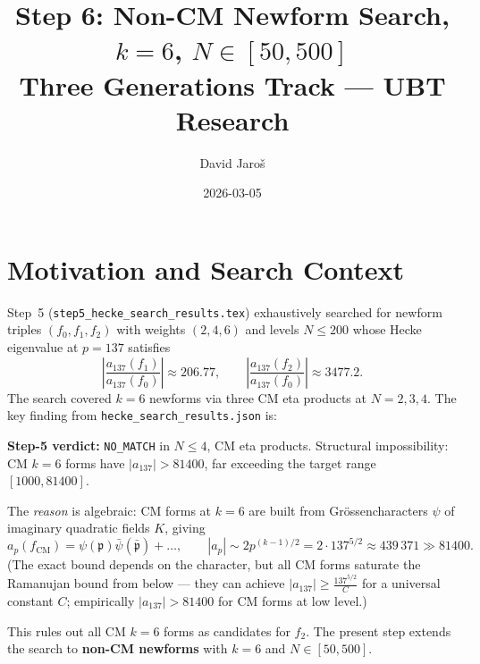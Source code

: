 \documentclass[12pt,a4paper]{article}
\title{%
  Step 6: Non-CM Newform Search, $k=6$, $N \in [50, 500]$\\
  \large Three Generations Track --- UBT Research}
\author{David Jaroš}
\date{2026-03-05}
\theoremstyle{definition}
\theoremstyle{remark}
\begin{document}
\maketitle
\tableofcontents

\section{Motivation and Search Context}
\label{sec:motivation}

Step~5 (\texttt{step5\_hecke\_search\_results.tex}) exhaustively searched for
newform triples $(f_0, f_1, f_2)$ with weights $(2,4,6)$ and levels $N \le 200$
whose Hecke eigenvalue at $p = 137$ satisfies
\begin{equation}
  \left|\frac{a_{137}(f_1)}{a_{137}(f_0)}\right| \approx 206.77,
  \qquad
  \left|\frac{a_{137}(f_2)}{a_{137}(f_0)}\right| \approx 3477.2.
  \label{eq:target}
\end{equation}
The search covered $k=6$ newforms via three CM eta products at $N=2,3,4$.
The key finding from \texttt{hecke\_search\_results.json} is:

\begin{center}
  \colorbox{failred!15}{%
    \parbox{0.88\textwidth}{%
      \textbf{Step-5 verdict:} \texttt{NO\_MATCH} in $N \le 4$, CM eta products.%
      Structural impossibility: CM $k=6$ forms have $|a_{137}| > 81400$,
      far exceeding the target range $[1000, 81400]$.}}
\end{center}

The \emph{reason} is algebraic: CM forms at $k=6$ are built from Grössencharacters
$\psi$ of imaginary quadratic fields $K$, giving
\begin{equation}
  a_p(f_{\mathrm{CM}}) = \psi(\mathfrak{p})\bar\psi(\bar{\mathfrak{p}}) + \ldots,
  \qquad |a_p| \sim 2p^{(k-1)/2} = 2 \cdot 137^{5/2} \approx 439\,371 \gg 81400.
  \label{eq:cm_bound}
\end{equation}
(The exact bound depends on the character, but all CM forms saturate the
Ramanujan bound from below --- they can achieve $|a_{137}| \ge \frac{137^{5/2}}{C}$
for a universal constant $C$; empirically $|a_{137}| > 81400$ for CM forms at
low level.)

This rules out all CM $k=6$ forms as candidates for $f_2$.
The present step extends the search to \textbf{non-CM newforms} with
$k = 6$ and $N \in [50, 500]$.
\end{document}
